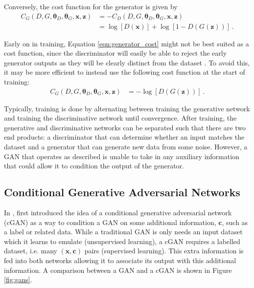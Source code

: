 \documentclass[11pt,a4paper,onecolumn]{report}
\begin{document}
\noindent Conversely, the cost function for the generator is given by
\begin{align}
  C_G(D, G, \bm{\theta}_D, \bm{\theta}_G, \bm{x}, \bm{z})
  &= -C_D(D, G, \bm{\theta}_D, \bm{\theta}_G, \bm{x}, \bm{z})\\
  &= \log[D(\bm{x})] + \log[1 - D(G(\bm{z}))] \,.
  \label{eqn:generator_cost}
\end{align}

Early on in training, Equation \ref{eqn:generator_cost} might not be best suited
as a cost function, since the discriminator will easily be able to reject the
early generator outputs as they will be clearly distinct from the dataset
\citep{Goodfellow2014}. To avoid this, it may be more efficient to instead use
the following cost function at the start of training:
\begin{align}
  C_G(D, G, \bm{\theta}_D, \bm{\theta}_G, \bm{x}, \bm{z})
  &= -\log[D(G(\bm{z}))]\,.
\end{align}

Typically, training is done by alternating between training the generative
network and training the discriminative network until convergence. After
training, the generative and discriminative networks can be separated such that
there are two end products: a discriminator that can determine whether an input
matches the dataset and a generator that can generate new data from some noise.
However, a GAN that operates as described is unable to take in any auxiliary
information that could allow it to condition the output of the generator.

\subsection{Conditional Generative Adversarial Networks}
\label{sec:cgan}
In \citeyear{mirza_conditional_2014}, \citeauthor{mirza_conditional_2014} first
introduced the idea of a conditional generative adversarial network (cGAN) as a
way to condition a GAN on some additional information, \(\bm{c}\), such as a
label or related data. While a traditional GAN is only needs an input dataset
which it learns to emulate (unsupervised learning), a cGAN requires a labelled
dataset, i.e. many \((\bm{x}, \bm{c})\) pairs (supervised learning). This extra
information is fed into both networks allowing it to associate its output with
this additional information. A comparison between a GAN and a cGAN is shown in
Figure \ref{fig:gans}.\\
\end{document}
